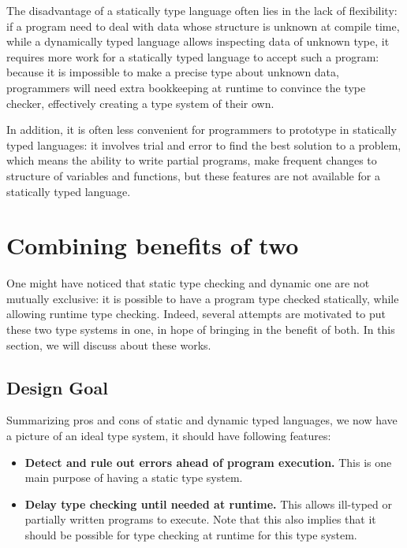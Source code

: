 
The disadvantage of a statically type language often lies in the lack of flexibility:
if a program need to deal with data whose structure is unknown at compile time,
while a dynamically typed language allows inspecting data of unknown type,
it requires more work for a statically typed language to accept such a program:
because it is impossible to make a precise type about unknown data,
programmers will need extra bookkeeping at runtime to convince the type checker,
effectively creating a type system of their own.

In addition, it is often less convenient for programmers to prototype
in statically typed languages: it involves trial and error to find the best solution
to a problem, which means the ability to write partial programs, make frequent changes to
structure of variables and functions, but these features are not available for a statically
typed language.


\section{Combining benefits of two}


One might have noticed that static type checking and dynamic one
are not mutually exclusive: it is possible to have a program type checked
statically, while allowing runtime type checking.
Indeed, several attempts are motivated to put these two type systems in one,
in hope of bringing in the benefit of both.
In this section, we will discuss about these works.

\subsection{Design Goal}

Summarizing pros and cons of static and dynamic typed languages,
we now have a picture of an ideal type system, it should have following features:

\begin{itemize}
	\item \textbf{Detect and rule out errors ahead of program execution.} This is one main purpose of having a static type system.
	\item \textbf{Delay type checking until needed at runtime.}
	This allows ill-typed or partially written programs to execute.
	Note that this also implies that it should be possible for type checking
	at runtime for this type system.
\end{itemize}

